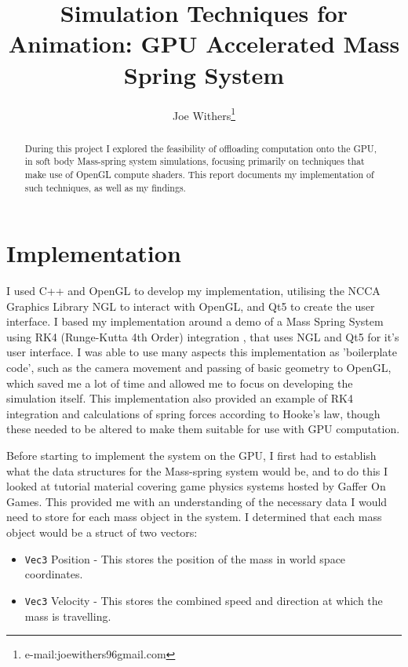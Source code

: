 \documentclass[]{acmsiggraph}
\title{Simulation Techniques for Animation: GPU Accelerated Mass Spring System}
\author{Joe Withers\thanks{e-mail:joewithers96gmail.com}}
\begin{document}

\maketitle

\begin{abstract}
During this project I explored the feasibility of offloading computation onto the GPU, in soft body Mass-spring system simulations, focusing primarily on techniques that make use of OpenGL compute shaders. This report documents my implementation of such techniques, as well as my findings.
\end{abstract}

\section{Implementation} \label{sec:implementation}

I used C++ and OpenGL to develop my implementation, utilising the NCCA Graphics Library NGL \cite{ngl} to interact with OpenGL, and Qt5 to create the user interface. I based my implementation around a demo of a Mass Spring System using RK4 (Runge-Kutta 4th Order) integration \cite{nglMassSpring}, that uses NGL and Qt5 for it's user interface. I was able to use many aspects this implementation as 'boilerplate code', such as the camera movement and passing of basic geometry to OpenGL, which saved me a lot of time and allowed me to focus on developing the simulation itself. This implementation also provided an example of RK4 integration and calculations of spring forces according to Hooke's law, though these needed to be altered to make them suitable for use with GPU computation.

Before starting to implement the system on the GPU, I first had to establish what the data structures for the Mass-spring system would be, and to do this I looked at tutorial material covering game physics systems \cite{gafferPhys} hosted by Gaffer On Games. This provided me with an understanding of the necessary data I would need to store for each mass object in the system. I determined that each mass object would be a struct of two vectors:

\begin{itemize}
	\item \lstinline{Vec3} Position - This stores the position of the mass in world space coordinates.
	\item \lstinline{Vec3} Velocity - This stores the combined speed and direction at which the mass is travelling.
\end{itemize}
\end{document}
